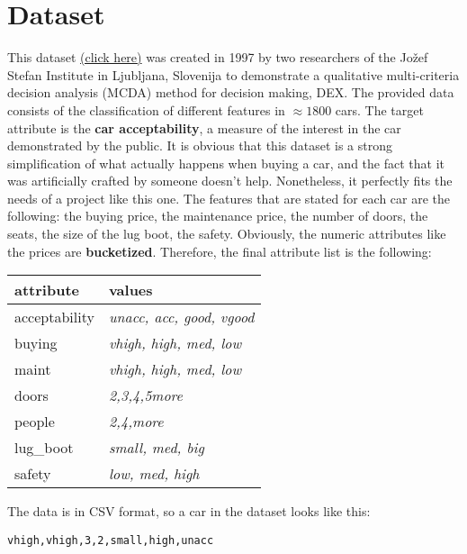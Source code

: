 \section{Dataset}
\label{sec:dataset}
This dataset \href{https://archive.ics.uci.edu/ml/datasets/Car+Evaluation}{(click here)} was created in 1997 by two researchers of the Jožef Stefan Institute in Ljubljana, Slovenija to demonstrate a qualitative multi-criteria decision analysis (MCDA) method for decision making, DEX. The provided data consists of the classification of different features in $\approx 1800$ cars. The target attribute is the \textbf{car acceptability}, a measure of the interest in the car demonstrated by the public. It is obvious that this dataset is a strong simplification of what actually happens when buying a car, and the fact that it was artificially crafted by someone doesn't help. Nonetheless, it perfectly fits the needs of a project like this one. The features that are stated for each car are the following: the buying price, the maintenance price, the number of doors, the seats, the size of the lug boot, the safety. Obviously, the numeric attributes like the prices are \textbf{bucketized}. Therefore, the final attribute list is the following:
\begin{center}
\begin{tabular}{|l|l|}
\hline
\textbf{attribute} & \textbf{values}\\
\hline
acceptability & \textit{unacc, acc, good, vgood}\\
\hline
buying & \textit{vhigh, high, med, low}\\
\hline
maint & \textit{vhigh, high, med, low}\\
\hline
doors & \textit{2,3,4,5more}\\
\hline
people & \textit{2,4,more}\\
\hline
lug\_boot & \textit{small, med, big}\\
\hline
safety & \textit{low, med, high}\\
\hline
\end{tabular}
\end{center}
The data is in CSV format, so a car in the dataset looks like this:
\begin{center}
    \texttt{vhigh,vhigh,3,2,small,high,unacc}
\end{center}